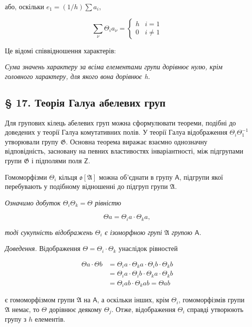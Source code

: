 \documentclass[11pt]{article}
\begin{document}
або, оскільки \(e_1 = (1/h) \sum a_i\),

\[
\sum_\nu \Theta_i a_\nu=\begin{cases} h & i=1\\ 0 & i\ne 1 \end{cases}
\]

Це відомі співвідношення характерів:

\emph{Сума значень характеру за всіма елементами групи дорівнює нулю, крім головного характеру, для якого вона дорівнює h.}

\subsection*{§ 17. Теорія Галуа абелевих груп}\label{die-galoissche-theorie-abelscher-gruppen}

Для групових кілець абелевих груп можна сформулювати теореми, подібні до доведених у теорії Галуа комутативних полів. У теорії Галуа відображення \(\Theta_i\Theta_1^{-1}\) утворювали групу \(\mathfrak{G}\). Основна теорема виражає взаємно однозначну відповідність, засновану на певних властивостях інваріантності, між підгрупами групи \(\mathfrak{G}\) і підполями поля \(\mathsf{Z}\).

Гомоморфізми \(\Theta_i\) кільця \(\mathfrak{o}[\mathfrak{A}]\) можна об'єднати в групу \(\mathsf A\), підгрупи якої перебувають у подібному відношенні до підгруп групи \(\mathfrak{A}\).

\emph{Означимо добуток \(\Theta_i \Theta_k = \Theta\) рівністю}

\[\Theta a = \Theta_i a \cdot \Theta_k a,\]

\emph{тоді сукупність відображень \(\Theta_i\) є ізоморфною групі \(\mathfrak A\) групою \(\mathsf A\).}

\emph{Доведення.} Відображення \(\Theta = \Theta_i \cdot \Theta_k\) унаслідок рівностей

\[\begin{aligned}
\Theta a \cdot \Theta b &= \Theta_i a \cdot \Theta_k a \cdot \Theta_i b \cdot \Theta_k b \\
&= \Theta_i a \cdot \Theta_i b \cdot \Theta_k a \cdot \Theta_k b \\
&= \Theta_i a b \cdot \Theta_k a b = \Theta a b
\end{aligned}\]

є гомоморфізмом групи \(\mathfrak A\) на \(\mathsf A\), а оскільки інших, крім \(\Theta_i\), гомоморфізмів групи \(\mathfrak A\) немає, то \(\Theta\) дорівнює деякому \(\Theta_j\). Отже, відображення \(\Theta_i\) справді утворюють групу з \(h\) елементів.
\end{document}
